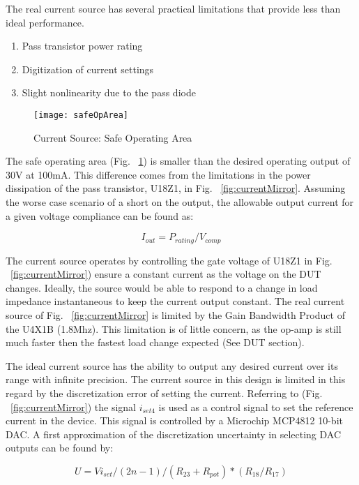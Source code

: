 The real current source has several practical limitations that provide less than ideal performance. 

\begin{enumerate}
\item Pass transistor power rating
\item Digitization of current settings
\item Slight nonlinearity due to the pass diode
\end{enumerate}


\begin{figure}[here]
\centering
\texttt{[image: safeOpArea]}
\caption{Current Source: Safe Operating Area}
\label{fig:safeOpArea}
\end{figure}

The safe operating area (Fig.  ~\ref{fig:safeOpArea}) is smaller than the desired operating output of 30V at 100mA. This difference comes from the limitations in the power dissipation of the pass transistor, U18Z1, in Fig. ~\ref{fig:currentMirror}. Assuming the worse case scenario of a short on the output, the allowable output current for a given voltage compliance can be found as:

\begin{equation}
I_{out} = P_{rating} / V_{comp}
\end{equation}

The current source operates by controlling the gate voltage of U18Z1 in Fig. ~\ref{fig:currentMirror}) ensure a constant current as the voltage on the DUT changes. Ideally, the source would be able to respond to a change in load impedance instantaneous to keep the current output constant. The real current source of Fig. ~\ref{fig:currentMirror} is limited by the Gain Bandwidth Product of the U4X1B (1.8Mhz). This limitation is of little concern, as the op-amp is still much faster then the fastest load change expected (See DUT section).

The ideal current source has the ability to output any desired current over its range with infinite precision. The current source in this design is limited in this regard by the discretization error of setting the current. Referring to (Fig. ~\ref{fig:currentMirror}) the signal $i_{set4}$ is used as a control signal to set the reference current in the device. This signal is controlled by a Microchip MCP4812 10-bit DAC. A first approximation of the discretization uncertainty in selecting DAC outputs can be found by:


\begin{equation}
U = Vi_{set} /(2n-1) / (R_{23} + R_{pot}) *(R_{18}/R_{17})
\end{equation}


